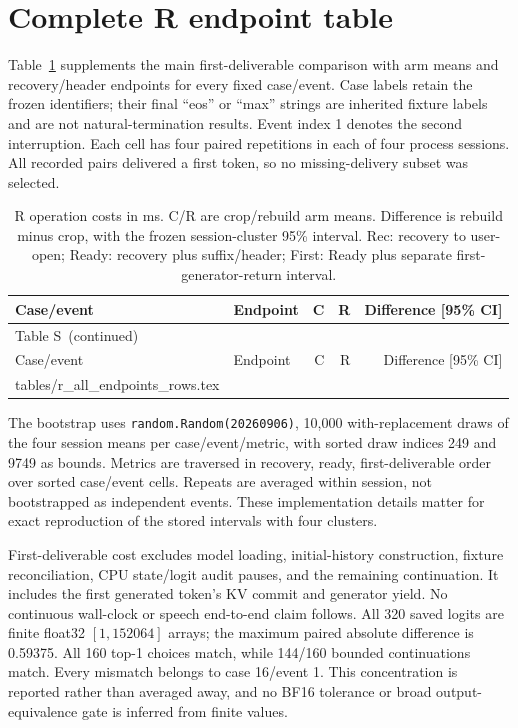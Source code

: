 \documentclass[12pt]{article}
\makeatletter
\newcommand{\tableinput}[1]{\@@input #1 }
\renewcommand{\thetable}{S\arabic{table}}
\makeatother
\begin{document}
\section{Complete R endpoint table}
\label{sec:s-r}

Table~\ref{tab:s-r} supplements the main first-deliverable comparison with arm means and recovery/header endpoints for every fixed case/event. Case labels retain the frozen identifiers; their final ``eos'' or ``max'' strings are inherited fixture labels and are not natural-termination results. Event index 1 denotes the second interruption. Each cell has four paired repetitions in each of four process sessions. All recorded pairs delivered a first token, so no missing-delivery subset was selected.

\begingroup\small
\setlength{\LTpre}{6pt}
\setlength{\LTpost}{6pt}
\begin{longtable}{@{}llrrr@{}}
\caption{R operation costs in ms. C/R are crop/rebuild arm means. Difference is rebuild minus crop, with the frozen session-cluster 95\% interval. Rec: recovery to user-open; Ready: recovery plus suffix/header; First: Ready plus separate first-generator-return interval.}\label{tab:s-r}\\
\toprule
Case/event & Endpoint & C & R & Difference [95\% CI] \\
\midrule\endfirsthead
\multicolumn{5}{l}{Table \thetable\ (continued)}\\
\toprule
Case/event & Endpoint & C & R & Difference [95\% CI] \\
\midrule\endhead
\bottomrule\endfoot
\tableinput{tables/r_all_endpoints_rows.tex}
\end{longtable}
\endgroup

The bootstrap uses \texttt{random.Random(20260906)}, 10,000 with-replacement draws of the four session means per case/event/metric, with sorted draw indices 249 and 9749 as bounds. Metrics are traversed in recovery, ready, first-deliverable order over sorted case/event cells. Repeats are averaged within session, not bootstrapped as independent events. These implementation details matter for exact reproduction of the stored intervals with four clusters.

First-deliverable cost excludes model loading, initial-history construction, fixture reconciliation, CPU state/logit audit pauses, and the remaining continuation. It includes the first generated token's KV commit and generator yield. No continuous wall-clock or speech end-to-end claim follows. All 320 saved logits are finite float32 $[1,152064]$ arrays; the maximum paired absolute difference is 0.59375. All 160 top-1 choices match, while 144/160 bounded continuations match. Every mismatch belongs to case 16/event 1. This concentration is reported rather than averaged away, and no BF16 tolerance or broad output-equivalence gate is inferred from finite values.



\end{document}

